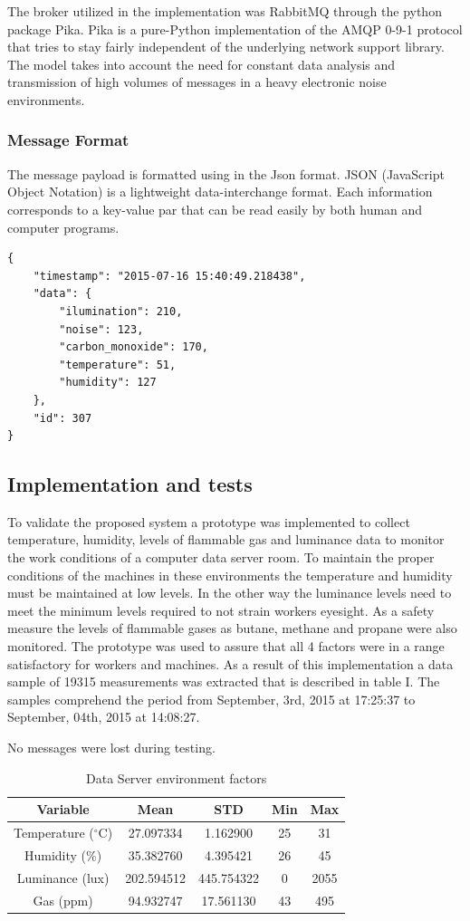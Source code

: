\documentclass[letterpaper]{IEEEtran}
\begin{document}
The broker utilized in the implementation was RabbitMQ through the python package Pika. Pika is a pure-Python implementation of the AMQP 0-9-1 protocol that tries to stay fairly independent of the underlying network support library\cite{Pika}.
The model takes into account the need for constant data analysis and transmission of high volumes of messages in a heavy electronic noise environments.
\subsubsection{Message Format}
The message payload is formatted using in the Json format.
JSON (JavaScript Object Notation) is a lightweight data-interchange format\cite{Json}.
Each information corresponds to a key-value par that can be read easily by both human and computer programs.
\begin{lstlisting}
{
    "timestamp": "2015-07-16 15:40:49.218438",
    "data": {
        "ilumination": 210,
        "noise": 123,
        "carbon_monoxide": 170,
        "temperature": 51,
        "humidity": 127
    },
    "id": 307
}

\end{lstlisting}
\subsection{Implementation and tests}
To validate the proposed system a prototype was implemented to collect temperature, humidity, levels of flammable gas and luminance data to monitor the work conditions of a computer data server room. To maintain the proper conditions of the machines in these environments the temperature and humidity must be maintained at low levels. In the other way the luminance levels need to meet the minimum levels required to not strain workers eyesight. As a safety measure the levels of flammable gases as butane, methane and propane were also monitored. The prototype was used to assure that all 4 factors were in a range satisfactory for workers and machines. As a result of this implementation a data sample of 19315 measurements was extracted that is described in table I. The samples comprehend the period from September, 3rd, 2015 at 17:25:37 to September, 04th, 2015 at 14:08:27.

No messages were lost during testing.
\begin{table}[!ht]
\renewcommand{\arraystretch}{1.3}
\caption{Data Server environment factors}
\label{table_data}
\centering
\begin{tabular}{c||c||c||c||c}
\hline
\bfseries Variable & Mean & STD & Min & Max \bfseries \\
\hline\hline
Temperature ($^{\circ}$C) & 27.097334 & 1.162900 & 25 & 31 \\
Humidity (\%) & 35.382760 & 4.395421 & 26 & 45 \\
Luminance (lux) & 202.594512 & 445.754322 & 0 & 2055 \\
Gas (ppm) & 94.932747 & 17.561130 & 43 & 495 \\
\end{tabular}
\end{table}
\end{document}
